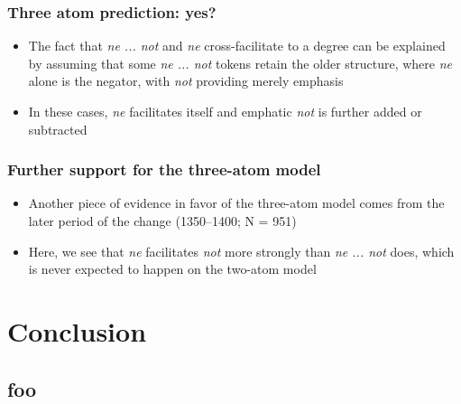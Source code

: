 \documentclass{digs-slides}
\newcommand{\includegraph}[1]{\mode<beamer>{}
    \mode<handout>{}}
\begin{document}
\begin{frame}
    \frametitle{Three atom prediction: yes?}
    \begin{itemize}
      \item The fact that \emph{ne ... not} and \emph{ne}
        cross-facilitate to a degree can be explained by assuming that
        some \emph{ne ... not} tokens retain the older structure, where
        \emph{ne} alone is the negator, with \emph{not} providing merely
        emphasis
      \item In these cases, \emph{ne} facilitates itself and emphatic
        \emph{not} is further added or subtracted
    \end{itemize}

    \begin{center}
        \small
    \end{center}
\end{frame}

\begin{frame}
    \frametitle{Further support for the three-atom model}
    \begin{itemize}
      \item Another piece of evidence in favor of the three-atom model
        comes from the later period of the change (1350–1400; N = 951)
      \item Here, we see that \emph{ne} facilitates \emph{not} more
        strongly than \emph{ne ... not} does, which is never expected to
        happen on the two-atom model
    \end{itemize}
    \includegraph{figures/nnb-fac-late}
\end{frame}

\section{Conclusion}
\label{sec:conclusion}

\subsection*{foo}
\end{document}
